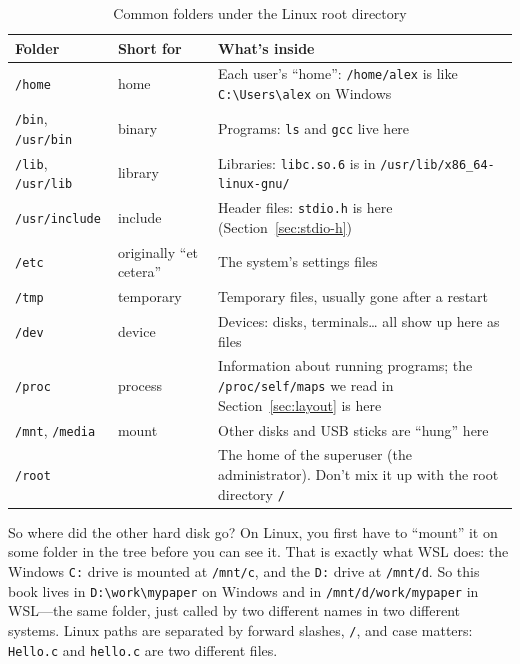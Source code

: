 \begin{table}[htbp]
  \begin{lazywide}
  \caption{Common folders under the Linux root directory}
  \label{tab:fhs}
  \begin{tabular}{lL{3.8cm}L{6.0cm}}
    \toprule
    Folder & Short for & What's inside \\
    \midrule
    \texttt{/home} & home & Each user's ``home'': \texttt{/home/alex} is like \texttt{C:\textbackslash Users\textbackslash alex} on Windows \\
    \texttt{/bin}, \texttt{/usr/bin} & binary & Programs: \texttt{ls} and \texttt{gcc} live here \\
    \texttt{/lib}, \texttt{/usr/lib} & library & Libraries: \texttt{libc.so.6} is in \texttt{/usr/lib/x86\_64-linux-gnu/} \\
    \texttt{/usr/include} & include & Header files: \texttt{stdio.h} is here (Section~\ref{sec:stdio-h}) \\
    \texttt{/etc} & originally ``et cetera'' & The system's settings files \\
    \texttt{/tmp} & temporary & Temporary files, usually gone after a restart \\
    \texttt{/dev} & device & Devices: disks, terminals\ldots{} all show up here as files \\
    \texttt{/proc} & process & Information about running programs; the \texttt{/proc/self/maps} we read in Section~\ref{sec:layout} is here \\
    \texttt{/mnt}, \texttt{/media} & mount & Other disks and USB sticks are ``hung'' here \\
    \texttt{/root} & & The home of the superuser (the administrator). Don't mix it up with the root directory \texttt{/} \\
    \bottomrule
  \end{tabular}
  \end{lazywide}
\end{table}

So where did the other hard disk go? On Linux, you first have to ``mount'' it on some folder in the tree before you can see it. That is exactly what WSL does: the Windows \texttt{C:} drive is mounted at \texttt{/mnt/c}, and the \texttt{D:} drive at \texttt{/mnt/d}. So this book lives in \texttt{D:\textbackslash work\textbackslash mypaper} on Windows and in \texttt{/mnt/d/work/mypaper} in WSL---the same folder, just called by two different names in two different systems. Linux paths are separated by forward slashes, \texttt{/}, and case matters: \texttt{Hello.c} and \texttt{hello.c} are two different files.

